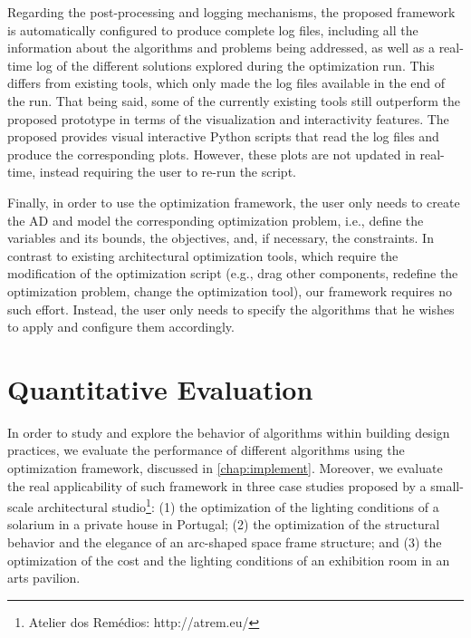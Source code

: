 Regarding the post-processing and logging mechanisms, the proposed framework is automatically configured to produce complete log files, including all the information about the algorithms and problems being addressed, as well as a real-time log of the different solutions explored during the optimization run. This differs from existing tools, which only made the log files available in the end of the run. That being said, some of the currently existing tools still outperform the proposed prototype in terms of the visualization and interactivity features. The proposed provides visual interactive Python scripts that read the log files and produce the corresponding plots. However, these plots are not updated in real-time, instead requiring the user to re-run the script.

Finally, in order to use the optimization framework, the user only needs to create the \ac{AD} and model the corresponding optimization problem, i.e., define the variables and its bounds, the objectives, and, if necessary, the constraints. In contrast to existing architectural optimization tools, which require the modification of the optimization script (e.g., drag other components, redefine the optimization problem, change the optimization tool), our framework requires no such effort. Instead, the user only needs to specify the algorithms that he wishes to apply and configure them accordingly.

\section{Quantitative Evaluation}
\label{sec:quantitative}

In order to study and explore the behavior of algorithms within building design practices, we evaluate the performance of different algorithms using the optimization framework, discussed in \cref{chap:implement}. Moreover, we evaluate the real applicability of such framework in three case studies proposed by a small-scale architectural studio\footnote{Atelier dos Remédios: http://atrem.eu/}: (1) the optimization of the lighting conditions of a solarium in a private house in Portugal; (2) the optimization of the structural behavior and the elegance of an arc-shaped space frame structure; and (3) the optimization of the cost and the lighting conditions of an exhibition room in an arts pavilion.   

